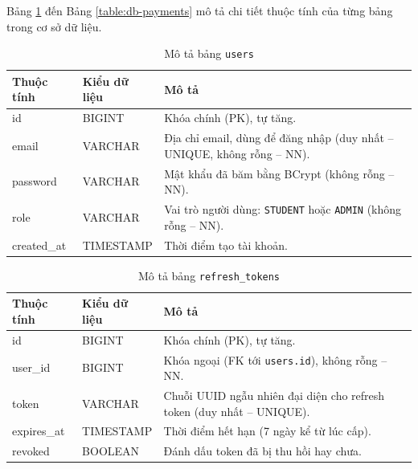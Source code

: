 \documentclass[../DoAn.tex]{subfiles}
\begin{document}
Bảng \ref{table:db-users} đến Bảng \ref{table:db-payments} mô tả chi tiết thuộc tính của từng bảng trong cơ sở dữ liệu.

\begin{table}[H]
\centering
\small
\renewcommand{\arraystretch}{1.2}
\begin{tabular}{|p{3.2cm}|p{2.4cm}|p{8cm}|}
\hline
\textbf{Thuộc tính} & \textbf{Kiểu dữ liệu} & \textbf{Mô tả} \\ \hline
id & BIGINT & Khóa chính (PK), tự tăng. \\ \hline
email & VARCHAR & Địa chỉ email, dùng để đăng nhập (duy nhất -- UNIQUE, không rỗng -- NN). \\ \hline
password & VARCHAR & Mật khẩu đã băm bằng BCrypt (không rỗng -- NN). \\ \hline
role & VARCHAR & Vai trò người dùng: \texttt{STUDENT} hoặc \texttt{ADMIN} (không rỗng -- NN). \\ \hline
created\_at & TIMESTAMP & Thời điểm tạo tài khoản. \\ \hline
\end{tabular}
\renewcommand{\arraystretch}{1}
\caption{Mô tả bảng \texttt{users}}
\label{table:db-users}
\end{table}

\begin{table}[H]
\centering
\small
\renewcommand{\arraystretch}{1.2}
\begin{tabular}{|p{3.2cm}|p{2.4cm}|p{8cm}|}
\hline
\textbf{Thuộc tính} & \textbf{Kiểu dữ liệu} & \textbf{Mô tả} \\ \hline
id & BIGINT & Khóa chính (PK), tự tăng. \\ \hline
user\_id & BIGINT & Khóa ngoại (FK tới \texttt{users.id}), không rỗng -- NN. \\ \hline
token & VARCHAR & Chuỗi UUID ngẫu nhiên đại diện cho refresh token (duy nhất -- UNIQUE). \\ \hline
expires\_at & TIMESTAMP & Thời điểm hết hạn (7 ngày kể từ lúc cấp). \\ \hline
revoked & BOOLEAN & Đánh dấu token đã bị thu hồi hay chưa. \\ \hline
\end{tabular}
\renewcommand{\arraystretch}{1}
\caption{Mô tả bảng \texttt{refresh\_tokens}}
\label{table:db-refresh-tokens}
\end{table}
\end{document}
